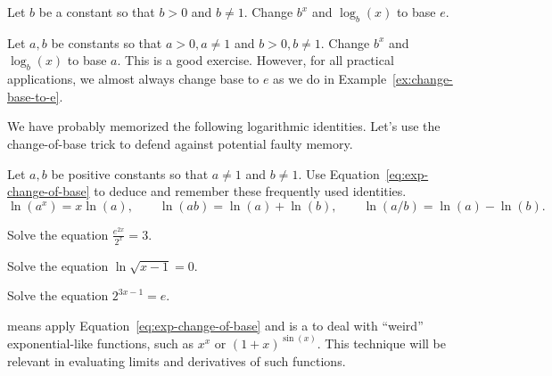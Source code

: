 \documentclass[../main.tex]{subfiles}
\begin{document}
\begin{example} \label{ex:change-base-to-e}
  Let \(b\) be a constant so that \(b > 0\) and \(b \ne 1\).  Change \(b^{x}\) and \(\log_{b}(x)\) to base \(e\). 

\end{example}
\clearpage


\begin{example}
  Let \(a,b\) be constants so that \(a > 0, a \ne 1\) and \(b > 0, b \ne 1\).  
  Change \(b^{x}\) and \(\log_{b}(x)\) to base \(a\). \newline
  \faExclamationTriangle{} This is a good exercise. However, for all practical applications, we almost always change base to \(e\) as we do in Example~\ref{ex:change-base-to-e}.

\end{example}


We have probably memorized the following logarithmic identities. Let's use the change-of-base trick to defend against potential faulty memory.

\begin{example}
  Let \(a,b\) be positive constants so that \(a \ne 1\) and \(b \ne 1\). Use Equation~\eqref{eq:exp-change-of-base} to deduce and remember these frequently used identities.
  \[
    \ln(a^{x}) = x \ln(a),
    \qquad
    \ln(ab) = \ln(a) + \ln(b),
    \qquad
    \ln(a/b) = \ln(a) - \ln(b).
  \]
\end{example}

\clearpage

\begin{example}
  Solve the equation \(\frac{e^{2x}}{2^{x}} = 3\).

\end{example}

\begin{example}
  Solve the equation \(\ln \sqrt{x - 1} = 0\). 

\end{example}

\begin{example}
  Solve the equation \(2^{3x - 1} = e\).

\end{example}
\clearpage

\faStar{}  means apply Equation~\eqref{eq:exp-change-of-base} and is a  to deal with \enquote{weird} exponential-like functions, such as \(x^{x}\) or \((1+x)^{\sin(x)}\). This technique will be relevant in evaluating limits and derivatives of such functions.
\end{document}
